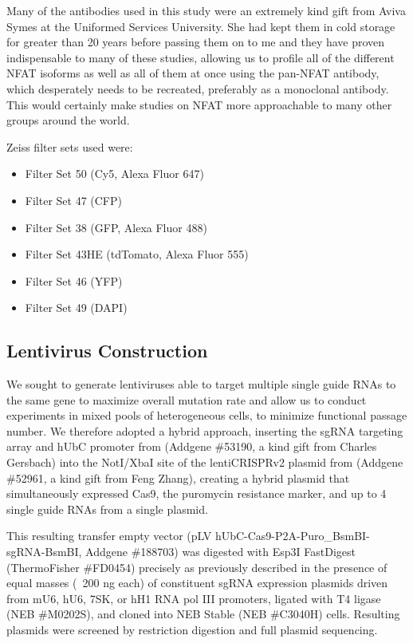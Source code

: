 Many of the antibodies used in this study were an extremely kind gift from Aviva Symes at the Uniformed Services University. She had kept them in cold storage for greater than 20 years before passing them on to me and they have proven indispensable to many of these studies, allowing us to profile all of the different NFAT isoforms as well as all of them at once using the pan-NFAT antibody, which desperately needs to be recreated, preferably as a monoclonal antibody. This would certainly make studies on NFAT more approachable to many other groups around the world.

Zeiss filter sets used were:
\singlespacing 
\begin{itemize}
\item Filter Set 50 (Cy5, Alexa Fluor 647)
\item Filter Set 47 (CFP)
\item Filter Set 38 (GFP, Alexa Fluor 488)
\item Filter Set 43HE (tdTomato, Alexa Fluor 555)
\item Filter Set 46 (YFP)
\item Filter Set 49 (DAPI)
\end{itemize}
\doublespacing

\subsection{Lentivirus Construction}\label{lenti}

We sought to generate lentiviruses able to target multiple single guide RNAs to the same gene to maximize overall mutation rate and allow us to conduct experiments in mixed pools of heterogeneous cells, to minimize functional passage number. We therefore adopted a hybrid approach, inserting the sgRNA targeting array and hUbC promoter from \citet{Kabadi2014} (Addgene \#53190, a kind gift from Charles Gersbach) into the NotI/XbaI site of the lentiCRISPRv2 plasmid from \citet{Sanjana2014} (Addgene \#52961, a kind gift from Feng Zhang), creating a hybrid plasmid that simultaneously expressed Cas9, the puromycin resistance marker, and up to 4 single guide RNAs from a single plasmid.

This resulting transfer empty vector (pLV hUbC-Cas9-P2A-Puro\_BsmBI-sgRNA-BsmBI, Addgene \#188703) was digested with Esp3I FastDigest (ThermoFisher \#FD0454) precisely as previously described \citep{Kabadi2014} in the presence of equal masses (~200 ng each) of constituent sgRNA expression plasmids driven from mU6, hU6, 7SK, or hH1 RNA pol III promoters, ligated with T4 ligase (NEB \#M0202S), and cloned into NEB Stable (NEB \#C3040H) cells. Resulting plasmids were screened by restriction digestion and full plasmid sequencing. 

